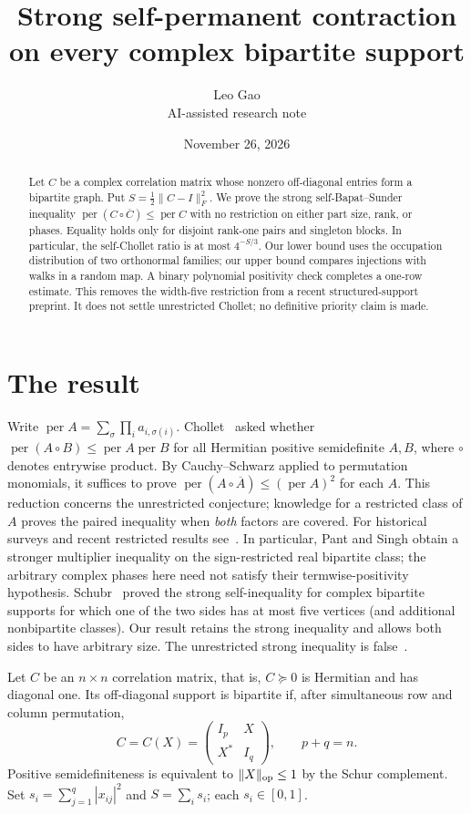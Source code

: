 \documentclass[11pt]{article}
\title{Strong self-permanent contraction on every complex bipartite support}
\author{Leo Gao\\\small AI-assisted research note}
\date{November 26, 2026}
\newcommand{\per}{\operatorname{per}}
\begin{document}
\maketitle
\begin{abstract}
Let $C$ be a complex correlation matrix whose nonzero off-diagonal
entries form a bipartite graph. Put $S=\tfrac12\|C-I\|_F^2$.
We prove the strong self-Bapat--Sunder inequality
$\per(C\circ\overline C)\le\per C$ with no restriction on either
part size, rank, or phases. Equality holds only for disjoint rank-one
pairs and singleton blocks. In particular, the self-Chollet ratio is at
most $4^{-S/3}$. Our lower bound uses the occupation distribution of
two orthonormal families; our upper bound compares injections with walks
in a random map. A binary polynomial positivity check completes a
one-row estimate. This removes the width-five restriction from a
recent structured-support preprint. It does not settle unrestricted
Chollet; no definitive priority claim is made.
\end{abstract}

\section{The result}
Write $\per A=\sum_{\sigma}\prod_i a_{i,\sigma(i)}$.
Chollet~\cite{Chollet} asked whether
$\per(A\circ B)\le\per A\per B$ for all Hermitian positive
semidefinite $A,B$, where $\circ$ denotes entrywise product. By
Cauchy--Schwarz applied to permutation monomials, it suffices to prove
$\per(A\circ\overline A)\le(\per A)^2$ for each $A$.
This reduction concerns the unrestricted conjecture; knowledge for a
restricted class of $A$ proves the paired inequality when \emph{both}
factors are covered. For historical surveys and recent restricted
results see~\cite{Wanless,Pant,rankfour}. In particular, Pant and
Singh obtain a stronger multiplier inequality on the sign-restricted
real bipartite class; the arbitrary complex phases here need not
satisfy their termwise-positivity hypothesis.
Schubr~\cite{Schubr} proved the strong self-inequality for complex
bipartite supports for which one of the two sides has at most five
vertices (and additional nonbipartite classes). Our result retains the
strong inequality and allows both sides to have arbitrary size.
The unrestricted strong inequality is false~\cite{Drury}.

Let $C$ be an $n\times n$ correlation matrix, that is, $C\succeq0$
is Hermitian and has diagonal one. Its off-diagonal support is bipartite
if, after simultaneous row and column permutation,
\[
 C=C(X)=\begin{pmatrix} I_p& X\\ X^*& I_q\end{pmatrix},\qquad p+q=n.
\]
Positive semidefiniteness is equivalent to $\|X\|_{\rm op}\le1$
by the Schur complement. Set $s_i=\sum_{j=1}^q|x_{ij}|^2$ and
$S=\sum_i s_i$; each $s_i\in[0,1]$.
\end{document}
